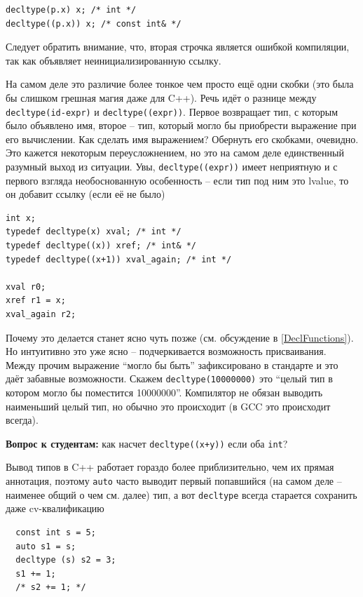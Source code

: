 \documentclass[a4paper,12pt,oneside]{article}
\newif\ifanswers
\begin{document}
\begin{lstlisting}
decltype(p.x) x; /* int */
decltype((p.x)) x; /* const int& */
\end{lstlisting}

Следует обратить внимание, что, вторая строчка является ошибкой компиляции, так как объявляет неинициализированную ссылку.

На самом деле это различие более тонкое чем просто ещё одни скобки (это была бы слишком грешная магия даже для C++). Речь идёт о разнице между \lstinline!decltype(id-expr)! и \lstinline!decltype((expr))!. Первое возвращает тип, с которым было объявлено имя, второе -- тип, который могло бы приобрести выражение при его вычислении. Как сделать имя выражением? Обернуть его скобками, очевидно. Это кажется некоторым переусложнением, но это на самом деле единственный разумный выход из ситуации. Увы, \lstinline!decltype((expr))! имеет неприятную и с первого взгляда необоснованную особенность -- если тип под ним это lvalue, то он добавит ссылку (если её не было)

\begin{lstlisting}
int x;
typedef decltype(x) xval; /* int */
typedef decltype((x)) xref; /* int& */
typedef decltype((x+1)) xval_again; /* int */

xval r0;
xref r1 = x;
xval_again r2;
\end{lstlisting}

Почему это делается станет ясно чуть позже (см. обсуждение в \ref{DeclFunctions}). Но интуитивно это уже ясно -- подчеркивается возможность присваивания. Между прочим выражение ``могло бы быть'' зафиксировано в стандарте и это даёт забавные возможности. Скажем \lstinline!decltype(10000000)! это ``целый тип в котором могло бы поместится 10000000''. Компилятор не обязан выводить наименьший целый тип, но обычно это происходит (в GCC это происходит всегда).

\textbf{Вопрос к студентам:} как насчет \lstinline!decltype((x+y))! если оба \lstinline!int!?

\ifanswers
Правильный ответ: конечно же сумма это не lvalue.
\fi

Вывод типов в C++ работает гораздо более приблизительно, чем их прямая аннотация, поэтому \lstinline!auto! часто выводит первый попавшийся (на самом деле -- наименее общий о чем см. далее) тип, а вот \lstinline!decltype! всегда старается сохранить даже cv-квалификацию

\begin{lstlisting}
  const int s = 5;
  auto s1 = s;
  decltype (s) s2 = 3;
  s1 += 1;
  /* s2 += 1; */
\end{lstlisting}
\end{document}
